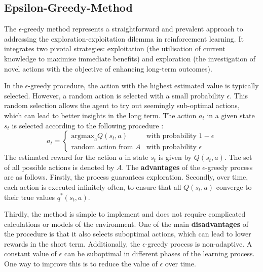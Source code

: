  \label{subsec: config}
\subsection{Epsilon-Greedy-Method} \label{subsec: epsilon-greedy}
The $\epsilon$-greedy method represents a straightforward and prevalent approach to addressing the exploration-exploitation dilemma in reinforcement learning. It integrates two pivotal strategies: exploitation (the utilisation of current knowledge to maximise immediate benefits) and exploration (the investigation of novel actions with the objective of enhancing long-term outcomes). \cite{sutton-2018}

In the $\epsilon$-greedy procedure, the action with the highest estimated value is typically selected. However, a random action is selected with a small probability $\epsilon$. This random selection allows the agent to try out seemingly sub-optimal actions, which can lead to better insights in the long term.
The action $a_t$ in a given state $s_t$ is selected according to the following procedure \cite{sutton-2018}:
\begin{equation}
a_t =
  \begin{cases} 
   \text{argmax}_a Q(s_t, a) & \text{with probability } 1 - \epsilon \\
   \text{random action from $A$} & \text{with probability } \epsilon 
  \end{cases}
\end{equation}
The estimated reward for the action $a$ in state $s_t$ is given by $Q(s_t, a)$. The set of all possible actions is denoted by $A$.
The \textbf{advantages} of the $\epsilon$-greedy process are as follows. Firstly, the process guarantees exploration. Secondly, over time, each action is executed infinitely often, to ensure that all $Q(s_t, a)$ converge to their true values $q^*(s_t, a)$. \cite{sutton-2018} 

Thirdly, the method is simple to implement and does not require complicated calculations or models of the environment.\newline
One of the main \textbf{disadvantages} of the procedure is that it also selects suboptimal actions, which can lead to lower rewards in the short term. Additionally, the $\epsilon$-greedy process is non-adaptive. A constant value of $\epsilon$ can be suboptimal in different phases of the learning process. One way to improve this is to reduce the value of $\epsilon$ over time. \cite{sutton-2018}

